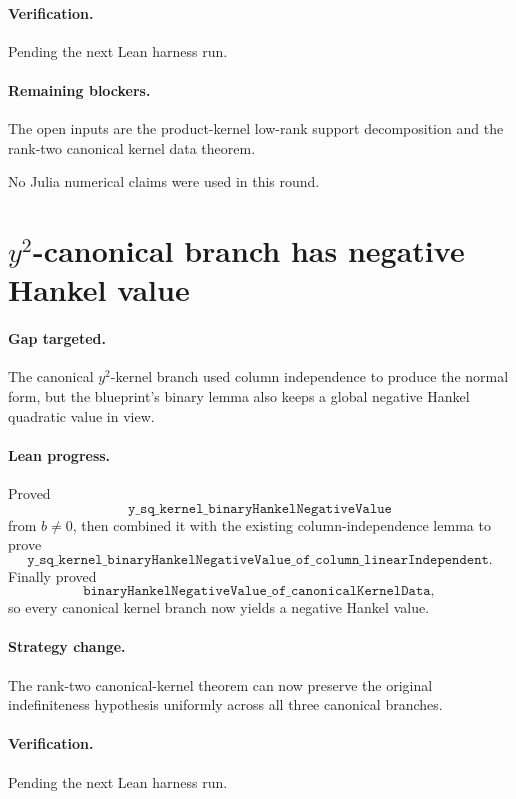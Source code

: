 \documentclass[11pt]{article}
\begin{document}
\paragraph{Verification.}
Pending the next Lean harness run.

\paragraph{Remaining blockers.}
The open inputs are the product-kernel low-rank support decomposition and the
rank-two canonical kernel data theorem.

No Julia numerical claims were used in this round.

\section*{\(y^2\)-canonical branch has negative Hankel value}

\paragraph{Gap targeted.}
The canonical \(y^2\)-kernel branch used column independence to produce the
normal form, but the blueprint's binary lemma also keeps a global negative
Hankel quadratic value in view.

\paragraph{Lean progress.}
Proved
\[
\texttt{y\_sq\_kernel\_binaryHankelNegativeValue}
\]
from \(b\ne0\), then combined it with the existing column-independence lemma
to prove
\[
\texttt{y\_sq\_kernel\_binaryHankelNegativeValue\_of\_column\_linearIndependent}.
\]
Finally proved
\[
\texttt{binaryHankelNegativeValue\_of\_canonicalKernelData},
\]
so every canonical kernel branch now yields a negative Hankel value.

\paragraph{Strategy change.}
The rank-two canonical-kernel theorem can now preserve the original
indefiniteness hypothesis uniformly across all three canonical branches.

\paragraph{Verification.}
Pending the next Lean harness run.
\end{document}
